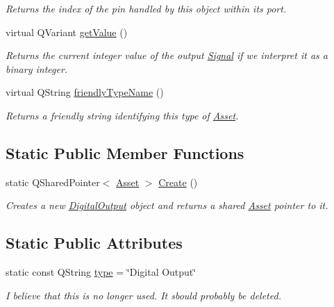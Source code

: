\begin{DoxyCompactItemize}
\begin{DoxyCompactList}\small\item\em Returns the index of the pin handled by this object within its port. \end{DoxyCompactList}\item 
virtual Q\-Variant \hyperlink{class_picto_1_1_digital_output_a3c367669d07f5c096a34584d87a66c08}{get\-Value} ()
\begin{DoxyCompactList}\small\item\em Returns the current integer value of the output \hyperlink{class_picto_1_1_signal}{Signal} if we interpret it as a binary integer. \end{DoxyCompactList}\item 
virtual Q\-String \hyperlink{class_picto_1_1_digital_output_a5d8aff3b7a814288c138eafc6aace133}{friendly\-Type\-Name} ()
\begin{DoxyCompactList}\small\item\em Returns a friendly string identifying this type of \hyperlink{class_picto_1_1_asset}{Asset}. \end{DoxyCompactList}\end{DoxyCompactItemize}
\subsection*{Static Public Member Functions}
\begin{DoxyCompactItemize}
\item 
\hypertarget{class_picto_1_1_digital_output_a176091c43cad039e1f0a164cec224dad}{static Q\-Shared\-Pointer$<$ \hyperlink{class_picto_1_1_asset}{Asset} $>$ \hyperlink{class_picto_1_1_digital_output_a176091c43cad039e1f0a164cec224dad}{Create} ()}\label{class_picto_1_1_digital_output_a176091c43cad039e1f0a164cec224dad}

\begin{DoxyCompactList}\small\item\em Creates a new \hyperlink{class_picto_1_1_digital_output}{Digital\-Output} object and returns a shared \hyperlink{class_picto_1_1_asset}{Asset} pointer to it. \end{DoxyCompactList}\end{DoxyCompactItemize}
\subsection*{Static Public Attributes}
\begin{DoxyCompactItemize}
\item 
\hypertarget{class_picto_1_1_digital_output_a9a5b00eee2e4b6f968940cf05cfd9612}{static const Q\-String \hyperlink{class_picto_1_1_digital_output_a9a5b00eee2e4b6f968940cf05cfd9612}{type} = \char`\"{}Digital Output\char`\"{}}\label{class_picto_1_1_digital_output_a9a5b00eee2e4b6f968940cf05cfd9612}

\begin{DoxyCompactList}\small\item\em I believe that this is no longer used. It sbould probably be deleted. \end{DoxyCompactList}\end{DoxyCompactItemize}
